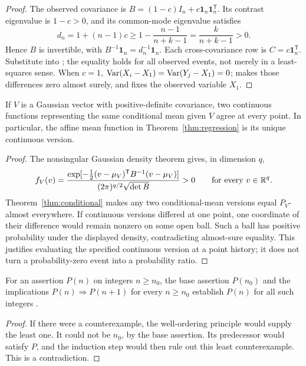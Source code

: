 \begin{proof}
The observed covariance is
\(B=(1-c)I_n+c\mathbf1_n\mathbf1_n^{\mathsf T}\).
Its contrast eigenvalue is \(1-c>0\), and its common-mode
eigenvalue satisfies
\[
 d_n=1+(n-1)c
 \geq 1-\frac{n-1}{n+k-1}
 =\frac{k}{n+k-1}>0.
\]
Hence \(B\) is invertible, with
\(B^{-1}\mathbf1_n=d_n^{-1}\mathbf1_n\).
Each cross-covariance row is \(C=c\mathbf1_n^{\mathsf T}\).
Substitute into ;
the equality holds for all observed events, not merely in a
least-squares sense. When \(c=1\),
\(\operatorname{Var}(X_i-X_1)=\operatorname{Var}(Y_j-X_1)=0\);
 makes those differences zero almost surely,
and  fixes the observed variable \(X_1\).
\end{proof}

\begin{lemma}
\label{lem:continuous-version}
If \(V\) is a Gaussian vector with positive-definite covariance, two
continuous functions representing the same conditional mean given \(V\)
agree at every point. In particular, the affine mean function in
Theorem~\ref{thm:regression} is its unique continuous version.
\end{lemma}

\begin{proof}
The nonsingular Gaussian density theorem
\cite[Theorem~3.4.6 and equation~(3.22), author-hosted draft]{gallager2013}
gives, in dimension \(q\),
\[
  f_V(v)=\frac{\exp[-\tfrac12(v-\mu_V)^{\mathsf{T}}B^{-1}(v-\mu_V)]}
                 {(2\pi)^{q/2}\sqrt{\det B}}>0
  \qquad\text{for every }v\in\mathbb R^q.
\]
Theorem~\ref{thm:conditional} makes any two conditional-mean versions equal
\(P_V\)-almost everywhere. If continuous versions differed at one point,
one coordinate of their difference would remain nonzero on some open ball.
Such a ball has positive probability under the displayed density, contradicting
almost-sure equality. This justifies evaluating the specified continuous
version at a point history; it does not turn a probability-zero event into
a probability ratio.
\end{proof}

\begin{theorem}
\label{thm:induction}
For an assertion \(P(n)\) on integers \(n\geq n_0\), the base assertion
\(P(n_0)\) and the implications \(P(n)\Rightarrow P(n+1)\) for every
\(n\geq n_0\) establish \(P(n)\) for all such integers
\cite[Section~10.1]{hammack2018}.
\end{theorem}

\begin{proof}
If there were a counterexample, the well-ordering principle would supply
the least one. It could not be \(n_0\), by the base assertion. Its predecessor
would satisfy \(P\), and the induction step would then rule out this least
counterexample. This is a contradiction.
\end{proof}
